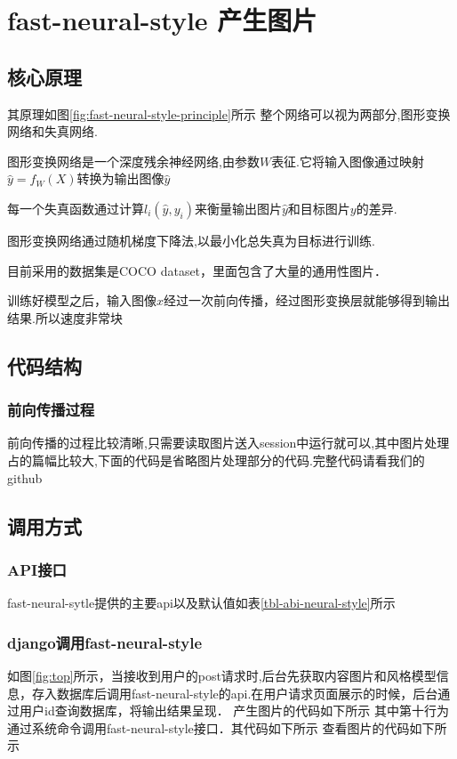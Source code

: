 \section{fast-neural-style 产生图片}
\subsection{核心原理}
其原理如图\ref{fig:fast-neural-style-principle}所示
整个网络可以视为两部分,图形变换网络和失真网络.

图形变换网络是一个深度残余神经网络,由参数$W$表征.它将输入图像通过映射$\hat y=f_W(X)$转换为输出图像$\hat y$

每一个失真函数通过计算$l_i(\hat y,y_i)$来衡量输出图片$\hat y$和目标图片$y$的差异.

图形变换网络通过随机梯度下降法,以最小化总失真为目标进行训练.

目前采用的数据集是COCO dataset，里面包含了大量的通用性图片．

训练好模型之后，输入图像$x$经过一次前向传播，经过图形变换层就能够得到输出结果.所以速度非常块
\subsection{代码结构}
\subsubsection{前向传播过程}
前向传播的过程比较清晰,只需要读取图片送入session中运行就可以,其中图片处理占的篇幅比较大,下面的代码是省略图片处理部分的代码.完整代码请看我们的github\cite{my-fast-neural-sytle-tensorflow}

\subsection{调用方式}

\subsubsection{API接口}
fast-neural-sytle提供的主要api以及默认值如表\ref{tbl-abi-neural-style}所示
\subsubsection{django调用fast-neural-style}
如图\ref{fig:top}所示，当接收到用户的post请求时,后台先获取内容图片和风格模型信息，存入数据库后调用fast-neural-style的api.在用户请求页面展示的时候，后台通过用户id查询数据库，将输出结果呈现．
产生图片的代码如下所示
其中第十行为通过系统命令调用fast-neural-style接口．其代码如下所示
查看图片的代码如下所示
